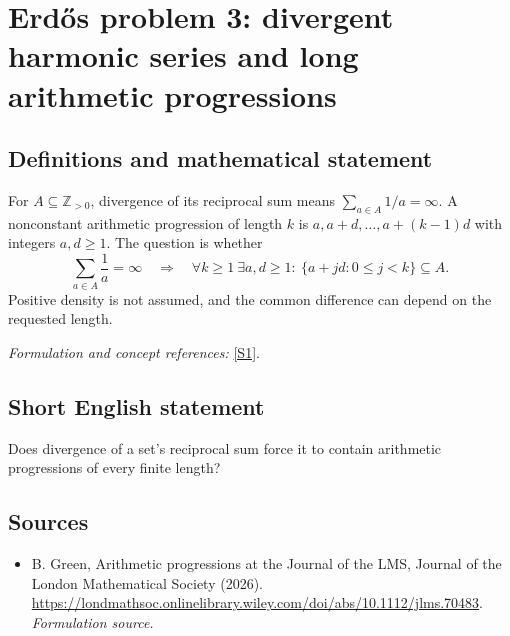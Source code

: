 \documentclass[11pt]{article}
\begin{document}
\section*{\texorpdfstring{Erdős problem 3: divergent harmonic series and long arithmetic progressions}{Erdős problem 3: divergent harmonic series and long arithmetic progressions}}\label{130}
\subsection{Definitions and mathematical statement}
For $A\subseteq{\mathbb{Z}}_{>0}$, divergence of its reciprocal sum means $\sum_{a\in A}1/a=\infty$. A nonconstant arithmetic progression of length $k$ is $a,a+d,\ldots,a+(k-1)d$ with integers $a,d\ge1$. The question is whether
\[
 \sum_{a\in A}\frac1a=\infty\quad\Longrightarrow\quad
 \forall k\ge1\ \exists a,d\ge1:\ \{a+jd:0\le j<k\}\subseteq A.
\]
Positive density is not assumed, and the common difference can depend on the requested length.
\par\smallskip\textit{Formulation and concept references:} \href{https://londmathsoc.onlinelibrary.wiley.com/doi/abs/10.1112/jlms.70483}{[S1]}.

\subsection{Short English statement}
Does divergence of a set's reciprocal sum force it to contain arithmetic progressions of every finite length?
\subsection{Sources}
\begin{itemize}
\item[S1]B. Green, Arithmetic progressions at the Journal of the LMS, Journal of the London Mathematical Society (2026).
\url{https://londmathsoc.onlinelibrary.wiley.com/doi/abs/10.1112/jlms.70483}.
\textit{Formulation source.}
\end{itemize}
\end{document}
